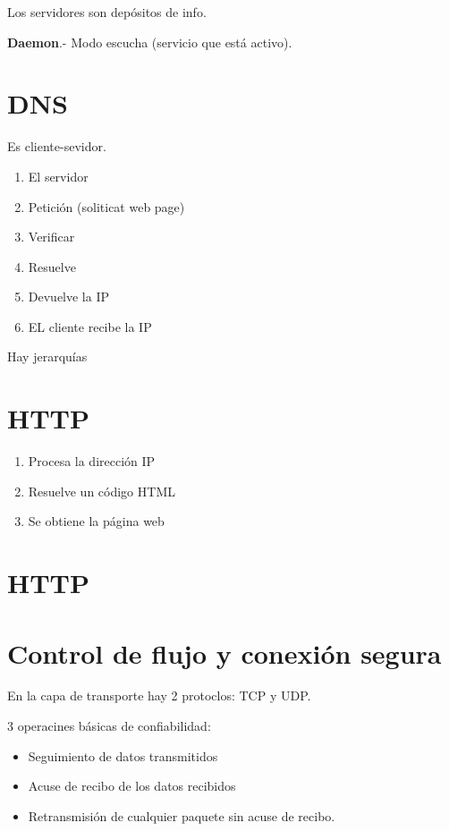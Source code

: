 \documentclass{article}
\begin{document}
Los servidores son depósitos de info.
\vspace{1em}

\textbf{Daemon}.- Modo escucha (servicio que está activo).
\vspace{1em}

\section{DNS}

Es cliente-sevidor.
\vspace{1em}

\begin{enumerate}
	\item
	El servidor
	\item
	Petición (soliticat web page)
	\item
	Verificar
	\item
	Resuelve
	\item
	Devuelve la IP
	\item
	EL cliente recibe la IP
\end{enumerate}
\vspace{1em}

Hay jerarquías

\section{HTTP}

\begin{enumerate}
	\item
	Procesa la dirección IP
	\item
	Resuelve un código HTML
	\item
	Se obtiene la página web
\end{enumerate}

\section{HTTP}

\section{Control de flujo y conexión segura}

En la capa de transporte hay 2 protoclos: TCP y UDP.
\vspace{1em}

3 operacines básicas de confiabilidad:

\begin{itemize}
	\item
	Seguimiento de datos transmitidos
	\item
	Acuse de recibo de los datos recibidos
	\item
	Retransmisión de cualquier paquete sin acuse de recibo.
\end{itemize}
\vspace{1em}
\end{document}
